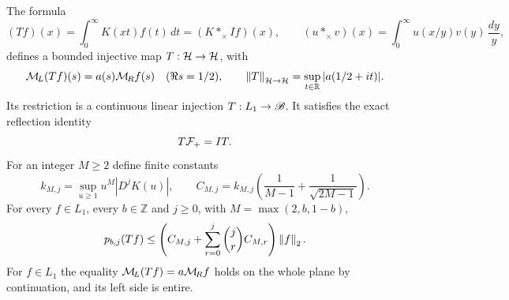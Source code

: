 \documentclass[11pt]{article}
\begin{document}
\begin{mburntheorem}\label{mburn:thm:T}
The formula
\begin{equation}\label{mburn:eq:T}
 (Tf)(x)=\int_0^\infty K(xt)f(t)\,dt
       =(K*_\times If)(x),\qquad
 (u*_\times v)(x)=\int_0^\infty u(x/y)v(y)\,\frac{dy}{y},
\end{equation}
defines a bounded injective map $T:\mathcal H\to\mathcal H$, with
\begin{equation}\label{mburn:eq:Tsymbol}
 \mathcal M_{\!L}(Tf)(s)=a(s)\mathcal M_{\!R} f(s)\quad(\Re s=1/2),\qquad
 \left\lVert T\right\rVert_{\mathcal H\to\mathcal H}=\sup_{t\in\mathbb R}|a(1/2+it)|.
\end{equation}
Its restriction is a continuous linear injection
$T:L_1\to\mathscr B$. It satisfies the exact reflection identity
\begin{equation}\label{mburn:eq:Tsym}
 T\mathcal F_+=IT.
\end{equation}
For an integer $M\geq2$ define finite constants
\begin{equation}\label{mburn:eq:constants}
 k_{M,j}=\sup_{u\geq1}u^M|D^jK(u)|,\qquad
 C_{M,j}=k_{M,j}\left(\frac1{M-1}+\frac1{\sqrt{2M-1}}\right).
\end{equation}
For every $f\in L_1$, every $b\in\mathbb Z$ and $j\geq0$,
with $M=\max(2,b,1-b)$,
\begin{equation}\label{mburn:eq:strongbound}
 p_{b,j}(Tf)\leq
 \left(C_{M,j}+\sum_{r=0}^j\binom jr C_{M,r}\right)\left\lVert f\right\rVert_2.
\end{equation}
For $f\in L_1$ the equality $\mathcal M_{\!L}(Tf)=a\mathcal M_{\!R} f$ holds on the
whole plane by continuation, and its left side is entire.
\end{mburntheorem}
\end{document}
